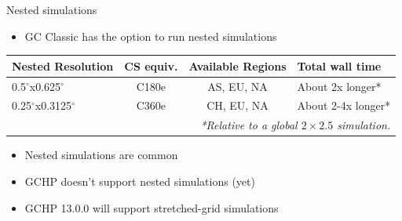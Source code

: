 \documentclass[10pt]{beamer}
\begin{document}
\begin{frame}[fragile]{Nested simulations}
    \begin{itemize}
        \item GC Classic has the option to run nested simulations
    \end{itemize}
    
    \footnotesize
    \begin{table}[]
    \begin{tabular}{lccl}
        \hline
        \textbf{Nested Resolution} & \textbf{CS equiv.} &  \textbf{Available Regions} & \textbf{Total wall time} \\ 
        \hline
        0.5$^{\circ}$x0.625$^{\circ}$ & C180e & AS, EU, NA & About 2x longer* \\ 
        0.25$^{\circ}$x0.3125$^{\circ}$ & C360e & CH, EU, NA & About 2-4x longer* \\ 
        \hline
        \multicolumn{4}{r}{\tiny\textit{*Relative to a global $2 \times 2.5$ simulation.}} \\ 
    \end{tabular}
    \end{table}
    \normalsize
    \begin{itemize}
        \item Nested simulations are common
    \end{itemize}
    \vfill
    \begin{itemize}
        \item GCHP doesn't support nested simulations (yet)
        \vspace{0.3cm}
        \item GCHP 13.0.0 will support stretched-grid simulations
    \end{itemize}
\end{frame}
\end{document}
